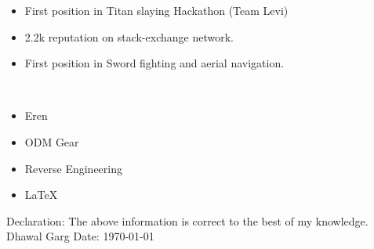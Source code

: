 \documentclass[10pt]{extarticle}
\newcommand{\yourname}{Dhawal Garg}%
\begin{document}
\begin{contained}
\vspace{0pt}
\begin{itemize}
\vspace{-8pt}
    \setlength\itemsep{0.5pt}
    \item First position in Titan slaying Hackathon (Team Levi)
    \item 2.2k reputation on stack-exchange network.
    \item First position in Sword fighting and aerial navigation.
\end{itemize}
\vspace{0pt}
\end{contained}
\begin{contained}\\
\begin{itemize}
\vspace{-8pt}
    \setlength\itemsep{0.5pt}
    \item Eren
    \item ODM Gear
    \item Reverse Engineering
    \item \LaTeX
\end{itemize}
\end{contained}
Declaration: The above information is correct to the best of my knowledge.\newline
\yourname\newline
Date: \today
\end{document}
